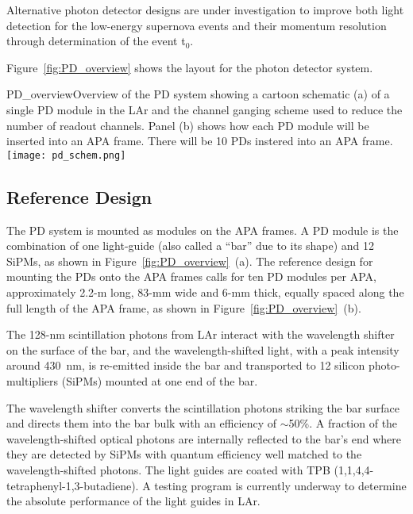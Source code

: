 Alternative photon detector designs
are under investigation to improve both light detection for the low-energy 
supernova
events and their momentum resolution through determination
of the event t$_0$. 

Figure~\ref{fig:PD_overview} shows the layout for the photon detector
system. %
\begin{cdrfigure}[PD Overview]{PD_overview}{Overview of the PD
    system showing a cartoon schematic (a) of a single PD module
    in the LAr and the channel ganging scheme used to reduce the
    number of readout channels. Panel (b) shows how each PD module
    will be inserted into an APA frame. There will be 10 PDs instered
    into an APA frame.}
\texttt{[image: pd\_schem.png]}
\end{cdrfigure}

\subsection{Reference Design}
\label{sec:detectors-fd-ref-pd-refsystem}   %

The PD system is mounted as modules on the APA frames. 
A PD module is the combination of one light-guide (also called a ``bar'' due to its shape)
and 12 SiPMs, as shown in Figure~\ref{fig:PD_overview}~(a).  %
The reference design for mounting the PDs onto the APA frames 
calls for
ten PD modules per APA, approximately 2.2-m
long, 83-mm wide and 6-mm thick, equally spaced along the full length
of the APA frame, as shown in Figure~\ref{fig:PD_overview}~(b). 

The 128-nm scintillation photons from LAr interact with the
wavelength shifter on the surface of the bar, and the wavelength-shifted light, 
with a peak intensity around 430~nm, is re-emitted inside the bar and transported %
to 12 silicon
photo-multipliers (SiPMs) mounted at one end of the bar.

The wavelength shifter converts the scintillation photons striking the
bar surface and directs them into the bar bulk with an efficiency of
$\sim$50\%.  A fraction of the wavelength-shifted optical photons are
internally reflected to the bar's end where they are detected by SiPMs
with quantum efficiency well matched to the wavelength-shifted
photons. The light guides are %
coated with TPB
(1,1,4,4-tetraphenyl-1,3-butadiene). A testing program is currently
underway to determine the absolute performance of the light guides in
LAr.

